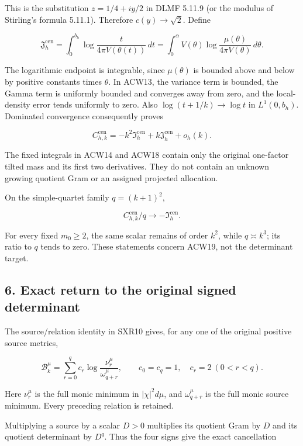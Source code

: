 This is the substitution \(z=1/4+iy/2\) in DLMF 5.11.9 (or the modulus of Stirling's formula 5.11.1). Therefore \(c(y)\to\sqrt2\). Define

\[
\mathfrak J_h^{\mathrm{cen}}
=\int_0^{b_h}
\log\frac{t}{4\pi V(\theta(t))}\,dt
=\int_0^\alpha
V(\theta)\log\frac{\mu(\theta)}{4\pi V(\theta)}\,d\theta.
\tag{ACW18}
\]

The logarithmic endpoint is integrable, since \(\mu(\theta)\) is bounded above and below by positive constants times \(\theta\). In ACW13, the variance term is bounded, the Gamma term is uniformly bounded and converges away from zero, and the local-density error tends uniformly to zero. Also \(\log(t+1/k)\to\log t\) in \(L^1(0,b_h)\). Dominated convergence consequently proves

\[
\boxed{
C_{h,k}^{\mathrm{cen}}
=-k^2\mathfrak I_h^{\mathrm{cen}}
+k\mathfrak J_h^{\mathrm{cen}}+o_h(k).}
\tag{ACW19}
\]

The fixed integrals in ACW14 and ACW18 contain only the original one-factor tilted mass and its first two derivatives. They do not contain an unknown growing quotient Gram or an assigned projected allocation.

On the simple-quartet family \(q=(k+1)^2\),

\[
C_{h,k}^{\mathrm{cen}}/q\longrightarrow-\mathfrak I_h^{\mathrm{cen}}.
\]

For every fixed \(m_0\ge2\), the same scalar remains of order \(k^2\), while \(q\asymp k^3\); its ratio to \(q\) tends to zero. These statements concern ACW19, not the determinant target.

\subsection{6. Exact return to the original signed determinant}\label{exact-return-to-the-original-signed-determinant}

The source/relation identity in SXR10 gives, for any one of the original positive source metrics,

\[
\mathcal B_k^\mu
=\sum_{r=0}^q c_r
\log\frac{\nu_r^\mu}{\omega_{q+r}^\mu},
\qquad c_0=c_q=1,\quad c_r=2\ (0<r<q).
\tag{ACW20}
\]

Here \(\nu_r^\mu\) is the full monic minimum in \(|\chi|^2d\mu\), and \(\omega_{q+r}^\mu\) is the full monic source minimum. Every preceding relation is retained.

Multiplying a source by a scalar \(D>0\) multiplies its quotient Gram by \(D\) and its quotient determinant by \(D^q\). Thus the four signs give the exact cancellation

